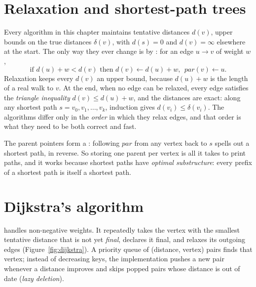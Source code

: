\section[Relaxation]{Relaxation and shortest-path trees \hfill \silver}\label{sec:relax}

Every algorithm in this chapter maintains tentative distances $d(v)$, upper bounds on the true distances $\delta(v)$, with
$d(s) = 0$ and $d(v) = \infty$ elsewhere at the start. The only way they ever change is by : for an edge
$u \to v$ of weight $w$,
\[
  \text{if } d(u) + w < d(v) \text{ then } d(v) \gets d(u) + w, \ \ \mathit{par}(v) \gets u .
\]
Relaxation keeps every $d(v)$ an upper bound, because $d(u) + w$ is the length of a real walk to $v$. At the end, when no
edge can be relaxed, every edge satisfies the \emph{triangle inequality} $d(v) \le d(u) + w$, and the distances are exact:
along any shortest path $s = v_0, v_1, \ldots, v_k$, induction gives $d(v_i) \le \delta(v_i)$. The algorithms differ only in
the \emph{order} in which they relax edges, and that order is what they need to be both correct and fast.

The parent pointers form a : following $\mathit{par}$ from any vertex back to $s$ spells out a
shortest path, in reverse. So storing one parent per vertex is all it takes to print paths, and it works because shortest
paths have \emph{optimal substructure}: every prefix of a shortest path is itself a shortest path.

\section[Dijkstra's algorithm]{Dijkstra's algorithm \hfill \gold}\label{sec:dijkstra}

 handles non-negative weights. It repeatedly takes the vertex with the smallest tentative distance
that is not yet \emph{final}, declares it final, and relaxes its outgoing edges (Figure~\ref{fig:dijkstra}). A priority queue
of (distance, vertex) pairs finds that vertex; instead of decreasing keys, the implementation pushes a new pair whenever a
distance improves and skips popped pairs whose distance is out of date (\emph{lazy deletion}).

